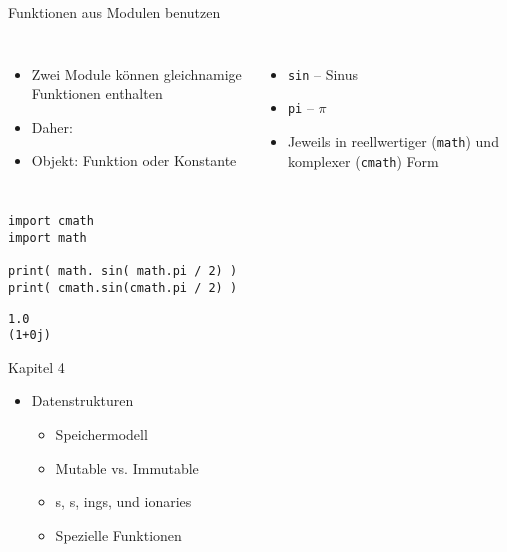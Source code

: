 
\begin{frame}[fragile]{Funktionen aus Modulen benutzen}
%
\begin{columns}
\begin{itemize}
\item Zwei Module können gleichnamige Funktionen enthalten
\item Daher: 
\item Objekt: Funktion oder Konstante
\end{itemize}
%
\begin{itemize}
\item \texttt{sin} -- Sinus
\item \texttt{pi} -- $\pi$
\item Jeweils in reellwertiger (\texttt{math}) und komplexer (\texttt{cmath}) Form 
\end{itemize}
\end{columns}
%
\begin{tcbraster}[raster columns=2,
                  raster equal height,
                  nobeforeafter,
                  raster column skip=0.5cm]
\begin{codebox}
\begin{verbatim}
import cmath
import math

print( math. sin( math.pi / 2) )
print( cmath.sin(cmath.pi / 2) )
\end{verbatim}
\end{codebox}
%
\begin{cmdbox}[Ausgabe]
\begin{verbatim}
1.0
(1+0j)
\end{verbatim}
\end{cmdbox}
\end{tcbraster}
%
\end{frame}


\begin{frame}{Kapitel 4}
%
\begin{itemize}
\item Datenstrukturen
	\begin{itemize}
	\item Speichermodell
	\item Mutable vs. Immutable
	\item {}s, s, ings,  und ionaries
	\item Spezielle Funktionen
	\end{itemize}
\end{itemize}
%
\end{frame}

